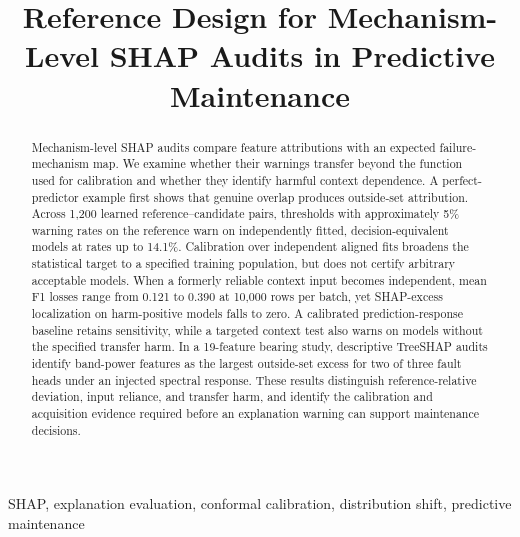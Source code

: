 \documentclass[conference]{IEEEtran}
\begin{document}
\title{Reference Design for Mechanism-Level SHAP Audits in Predictive Maintenance}
\author{
}
\maketitle
\begin{abstract}
Mechanism-level SHAP audits compare feature attributions with an expected failure-mechanism map. We examine whether their warnings transfer beyond the function used for calibration and whether they identify harmful context dependence. A perfect-predictor example first shows that genuine overlap produces outside-set attribution. Across 1,200 learned reference--candidate pairs, thresholds with approximately 5\% warning rates on the reference warn on independently fitted, decision-equivalent models at rates up to 14.1\%. Calibration over independent aligned fits broadens the statistical target to a specified training population, but does not certify arbitrary acceptable models. When a formerly reliable context input becomes independent, mean F1 losses range from 0.121 to 0.390 at 10,000 rows per batch, yet SHAP-excess localization on harm-positive models falls to zero. A calibrated prediction-response baseline retains sensitivity, while a targeted context test also warns on models without the specified transfer harm. In a 19-feature bearing study, descriptive TreeSHAP audits identify band-power features as the largest outside-set excess for two of three fault heads under an injected spectral response. These results distinguish reference-relative deviation, input reliance, and transfer harm, and identify the calibration and acquisition evidence required before an explanation warning can support maintenance decisions.
\end{abstract}
\begin{IEEEkeywords}
SHAP, explanation evaluation, conformal calibration, distribution shift, predictive maintenance
\end{IEEEkeywords}
\end{document}
